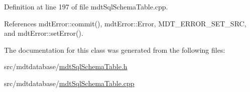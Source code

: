 Definition at line 197 of file mdt\-Sql\-Schema\-Table.\-cpp.



References mdt\-Error\-::commit(), mdt\-Error\-::\-Error, M\-D\-T\-\_\-\-E\-R\-R\-O\-R\-\_\-\-S\-E\-T\-\_\-\-S\-R\-C, and mdt\-Error\-::set\-Error().



The documentation for this class was generated from the following files\-:\begin{DoxyCompactItemize}
\item 
src/mdtdatabase/\hyperlink{mdt_sql_schema_table_8h}{mdt\-Sql\-Schema\-Table.\-h}\item 
src/mdtdatabase/\hyperlink{mdt_sql_schema_table_8cpp}{mdt\-Sql\-Schema\-Table.\-cpp}\end{DoxyCompactItemize}
